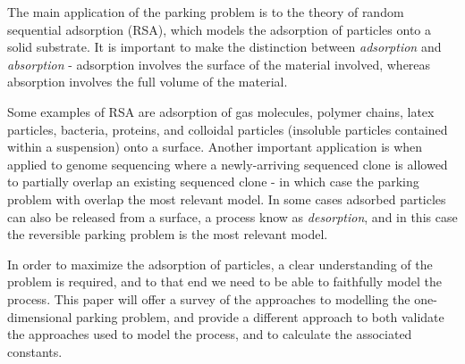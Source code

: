 The main application of the parking problem is to the theory of random 
sequential adsorption (RSA), which models the adsorption of particles onto 
a solid substrate. It is important to make the distinction between 
\emph{adsorption} and \emph{absorption} - adsorption involves the surface 
of the material involved, whereas absorption involves the full volume of 
the material. \bigskip

Some examples of RSA are adsorption of gas molecules, polymer chains, 
latex particles, bacteria, proteins, and colloidal particles (insoluble 
particles contained within a suspension) onto a surface. Another important 
application is when applied to genome sequencing where a newly-arriving 
sequenced clone is allowed to partially overlap an existing sequenced 
clone - in which case the parking problem with overlap the most relevant 
model. In some cases adsorbed particles can also be released from a 
surface, a process know as \emph{desorption}, and in this case the 
reversible parking problem is the most relevant model. \bigskip

In order to maximize the adsorption of particles, a clear understanding of 
the problem is required, and to that end we need to be able to faithfully 
model the process. This paper will offer a survey of the approaches to 
modelling the one-dimensional parking problem, and provide a different 
approach to both validate the approaches used to model the process, and to 
calculate the associated constants. \bigskip











